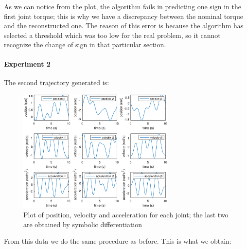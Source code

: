 \documentclass{article}
\begin{document}
As we can notice from the plot, the algorithm fails in predicting one sign in the first joint torque; this is why we have a discrepancy between the nominal torque and the reconstructed one. The reason of this error is because the algorithm has selected a threshold which was too low for the real problem, so it cannot recognize the change of sign in that particular section.

\paragraph{Experiment 2}
The second trajectory generated is:
\begin{figure}[!htbp]
\centering
\includegraphics[width=0.7\textwidth]{images/3-dof/trajectory456.eps}
\caption{Plot of position, velocity and acceleration for each joint; the last two are obtained by symbolic differentiation}
\end{figure}
\FloatBarrier

From this data we do the same procedure as before. This is what we obtain:
\end{document}
